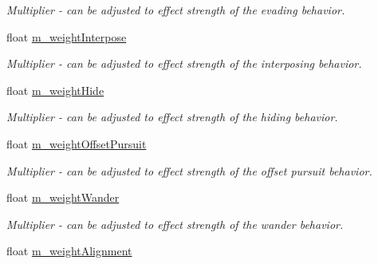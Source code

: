 \begin{DoxyCompactItemize}
\begin{DoxyCompactList}\small\item\em Multiplier -\/ can be adjusted to effect strength of the evading behavior. \end{DoxyCompactList}\item 
\hypertarget{classsteer_1_1_super_component_a10d96235f4dc1b8f94e493cfb4467a87}{float \hyperlink{classsteer_1_1_super_component_a10d96235f4dc1b8f94e493cfb4467a87}{m\-\_\-weight\-Interpose}}\label{classsteer_1_1_super_component_a10d96235f4dc1b8f94e493cfb4467a87}

\begin{DoxyCompactList}\small\item\em Multiplier -\/ can be adjusted to effect strength of the interposing behavior. \end{DoxyCompactList}\item 
\hypertarget{classsteer_1_1_super_component_a478260491716990f52554d9afb914bfe}{float \hyperlink{classsteer_1_1_super_component_a478260491716990f52554d9afb914bfe}{m\-\_\-weight\-Hide}}\label{classsteer_1_1_super_component_a478260491716990f52554d9afb914bfe}

\begin{DoxyCompactList}\small\item\em Multiplier -\/ can be adjusted to effect strength of the hiding behavior. \end{DoxyCompactList}\item 
\hypertarget{classsteer_1_1_super_component_a5271df7b865469ee56b9aca54ac07fe1}{float \hyperlink{classsteer_1_1_super_component_a5271df7b865469ee56b9aca54ac07fe1}{m\-\_\-weight\-Offset\-Pursuit}}\label{classsteer_1_1_super_component_a5271df7b865469ee56b9aca54ac07fe1}

\begin{DoxyCompactList}\small\item\em Multiplier -\/ can be adjusted to effect strength of the offset pursuit behavior. \end{DoxyCompactList}\item 
\hypertarget{classsteer_1_1_super_component_a0d14d90f7ad370e3e64abeed5eaaa459}{float \hyperlink{classsteer_1_1_super_component_a0d14d90f7ad370e3e64abeed5eaaa459}{m\-\_\-weight\-Wander}}\label{classsteer_1_1_super_component_a0d14d90f7ad370e3e64abeed5eaaa459}

\begin{DoxyCompactList}\small\item\em Multiplier -\/ can be adjusted to effect strength of the wander behavior. \end{DoxyCompactList}\item 
\hypertarget{classsteer_1_1_super_component_aae596167a99efd22caee49eda457b4d1}{float \hyperlink{classsteer_1_1_super_component_aae596167a99efd22caee49eda457b4d1}{m\-\_\-weight\-Alignment}}\label{classsteer_1_1_super_component_aae596167a99efd22caee49eda457b4d1}


\end{DoxyCompactItemize}
